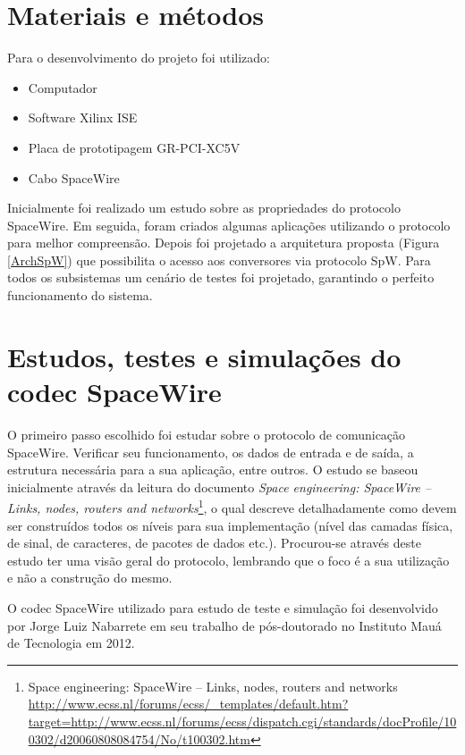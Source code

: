 \documentclass[
	12pt,				%
	openright,			%
	twoside,			%
	a4paper,			%
	english,			%
	french,				%
	spanish,			%
	brazil				%
	]{abntex2}
\let\svthefootnote\thefootnote
\begin{document}
\section{Materiais e métodos}
Para o desenvolvimento do projeto foi utilizado:

\begin{itemize}
	\item Computador
	\item Software Xilinx ISE
	\item Placa de prototipagem GR-PCI-XC5V
	\item Cabo SpaceWire
\end{itemize}

Inicialmente foi realizado um estudo sobre as propriedades do protocolo SpaceWire. Em seguida, foram criados algumas aplicações utilizando o protocolo para melhor compreensão. Depois foi projetado a arquitetura proposta (Figura \ref{ArchSpW}) que possibilita o acesso aos conversores via protocolo SpW. Para todos os subsistemas um cenário de testes foi projetado, garantindo o perfeito funcionamento do sistema.



\section{Estudos, testes e simulações do codec SpaceWire}
\let\thefootnote\svthefootnote
O primeiro passo escolhido foi estudar sobre o protocolo de comunicação SpaceWire. Verificar seu funcionamento, os dados de entrada e de saída, a estrutura necessária para a sua aplicação, entre outros. O estudo se baseou inicialmente através da leitura do documento \textit{Space engineering: SpaceWire – Links, nodes, routers and networks}\footnote{Space engineering: SpaceWire – Links, nodes, routers and networks \url{http://www.ecss.nl/forums/ecss/_templates/default.htm?target=http://www.ecss.nl/forums/ecss/dispatch.cgi/standards/docProfile/100302/d20060808084754/No/t100302.htm}}, o qual descreve detalhadamente como devem ser construídos todos os níveis para sua implementação (nível das camadas física, de sinal, de caracteres, de pacotes de dados etc.). Procurou-se através deste estudo ter uma visão geral do protocolo, lembrando que o foco é a sua utilização e não a construção do mesmo.

O codec SpaceWire utilizado para estudo de teste e simulação foi desenvolvido por Jorge Luiz Nabarrete em seu trabalho de pós-doutorado no Instituto Mauá de Tecnologia em 2012.
\end{document}
